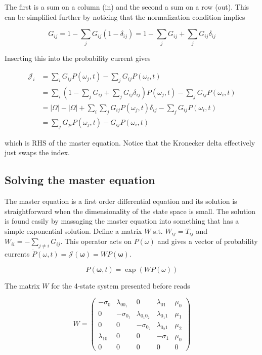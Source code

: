 \documentclass{ucetd}
\begin{document}
The first is a sum on a column (in) and the second a sum on a row (out). This can be simplified further by noticing that the normalization condition implies

\begin{equation*}
G_{ij} = 1 - \sum_{j}G_{ij}(1-\delta_{ij}) = 1 - \sum_{j}G_{ij} + \sum_{j}G_{ij}\delta_{ij}
\end{equation*}

Inserting this into the probability current gives

\begin{align*}
\mathcal{J}_{i} &= \sum_{i}G_{ij}P(\omega_{j},t) - \sum_{j}G_{ij}P(\omega_{i},t)\\
&= \sum_{i}\left(1 - \sum_{j}G_{ij} + \sum_{j}G_{ij}\delta_{ij}\right)P(\omega_{j},t) - \sum_{j}G_{ij}P(\omega_{i},t)\\
&= |\Omega| - |\Omega| + \sum_{i}\sum_{j}G_{ij}P(\omega_{j},t)\delta_{ij} - \sum_{j}G_{ij}P(\omega_{i},t)\\
&= \sum_{j}G_{ji}P(\omega_{j},t) - G_{ij}P(\omega_{i},t)
\end{align*}

which is RHS of the master equation. Notice that the Kronecker delta effectively just swaps the index. 

\subsection{Solving the master equation}

The master equation is a first order differential equation and its solution is straightforward when the dimensionality of the state space is small. The solution is found easily by massaging the master equation into something that has a simple exponential solution. Define a matrix $W$ s.t. $W_{ij} = T_{ij}$ and $W_{ii} = -\sum_{j\neq i}G_{ij}$. This operator acts on $P(\omega)$ and gives a vector of probability currents $\dot{P}(\omega,t) = \mathcal{J}(\bm{\omega}) = W P(\bm{\omega})$. 

\begin{equation*}
P(\bm{\omega}, t) = \exp(W P(\omega))
\end{equation*}

The matrix $W$ for the 4-state system presented before reads

\begin{equation*}
W = 
\begin{pmatrix}
-\sigma_{0} & \lambda_{0 0_{1}} & 0 & \lambda_{01} & \mu_{0}\\
0 & -\sigma_{0_{1}} & \lambda_{0_{1}0_{2}} & \lambda_{0_{1}1} & \mu_{1}\\
0 & 0 & -\sigma_{0_{2}} & \lambda_{0_{2}1} & \mu_{2}\\
\lambda_{10} & 0 & 0 & -\sigma_{1} & \mu_{0}\\
0 & 0 & 0 & 0 & 0
\end{pmatrix}
\end{equation*}
\end{document}
